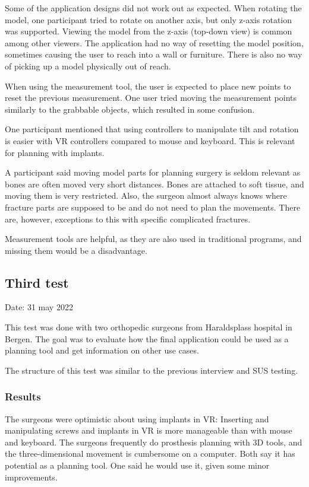 \documentclass[a4paper]{report}
\begin{document}
Some of the application designs did not work out as expected.
When rotating the model, one participant tried to rotate on another axis, but only z-axis rotation was supported. Viewing the model from the z-axis (top-down view) is common among other viewers.
The application had no way of resetting the model position, sometimes causing the user to reach into a wall or furniture. There is also no way of picking up a model physically out of reach.

When using the measurement tool, the user is expected to place new points to reset the previous measurement. One user tried moving the measurement points similarly to the grabbable objects, which resulted in some confusion.

One participant mentioned that using controllers to manipulate tilt and rotation is easier with VR controllers compared to mouse and keyboard. This is relevant for planning with implants.

A participant said moving model parts for planning surgery is seldom relevant as bones are often moved very short distances. Bones are attached to soft tissue, and moving them is very restricted.
Also, the surgeon almost always knows where fracture parts are supposed to be and do not need to plan the movements. There are, however, exceptions to this with specific complicated fractures.

Measurement tools are helpful, as they are also used in traditional programs, and missing them would be a disadvantage.

\subsection{Third test}
Date: 31 may 2022

This test was done with two orthopedic surgeons from Haraldsplass hospital in Bergen.
The goal was to evaluate how the final application could be used as a planning tool and get information on other use cases.


The structure of this test was similar to the previous interview and SUS testing.

\subsubsection{Results}
The surgeons were optimistic about using implants in VR: Inserting and manipulating screws and implants in VR is more manageable than with mouse and keyboard. The surgeons frequently do prosthesis planning with 3D tools, and the three-dimensional movement is cumbersome on a computer. 
Both say it has potential as a planning tool. One said he would use it, given some minor improvements.
\end{document}
